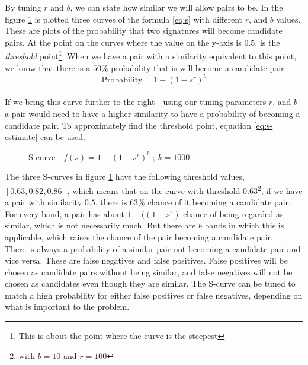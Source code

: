 \documentclass[a4paper,11pt]{article}
\begin{document}
By tuning $r$ and $b$, we can state how similar we will allow pairs to be. In the figure \ref{fig:scurve} is plotted three curves of the formula \ref{eq:s} with different $r$, and $b$ values. These are plots of the probability that two signatures will become candidate pairs. At the point on the curves where the value on the y-axis is 0.5, is the \emph{threshold} point\footnote{This is about the point where the curve is the steepest}. When we have a pair with a similarity equivalent to this point, we know that there is a $50\%$ probability that is will become a candidate pair. \\

\begin{equation}
    \text {Probability} = 1 - (1 - s^r)^b 
    \label{eq:s}
\end{equation}\\

If we bring this curve further to the right - using our tuning parameters $r$, and $b$ - a pair would need to have a higher similarity to have a probability of becoming a candidate pair. To approximately find the threshold point, equation \ref{eq:s-estimate} can be used.  \\


\begin{figure}[H]
    \begin{center}
        
        \caption{S-curve - $f(s) = 1 - (1 - s^r)^b$ ; $k = 1000$}
        \label{fig:scurve}
    \end{center}
\end{figure}

The three S-curves in figure \ref{fig:scurve} have the following threshold values, $[0.63, 0.82, 0.86]$, which means that on the curve with threshold $0.63$\footnote{with $b=10$ and $r=100$}, if we have a pair with similarity $0.5$, there is $63\%$ chance of it becoming a candidate pair. \\

For every band, a pair has about $1 - (\left(1-s^r \right)$ chance of being regarded as similar, which is not necessarily much. But there are $b$ bands in which this is applicable, which raises the chance of the pair becoming a candidate pair. \\

There is always a probability of a similar pair not becoming a candidate pair and vice versa. These are false negatives and false positives. False positives will be chosen as candidate pairs without being similar, and false negatives will not be chosen as candidates even though they are similar. The S-curve can be tuned to match a high probability for either false positives or false negatives, depending on what is important to the problem. \\
\end{document}

